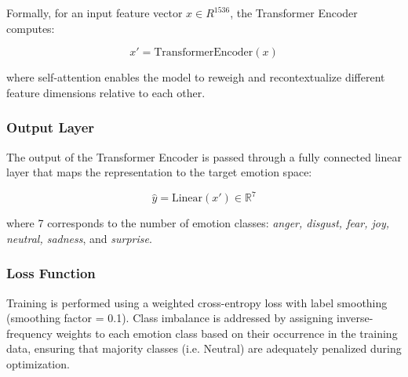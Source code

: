 \documentclass{article}
\begin{document}
Formally, for an input feature vector $ x \in {R}^{1536} $, the Transformer Encoder computes:

$$ x' = \text{TransformerEncoder}(x) $$

where self-attention enables the model to reweigh and recontextualize different feature dimensions relative to each other.

\subsubsection{Output Layer}
The output of the Transformer Encoder is passed through a fully connected linear layer that maps the representation to the target emotion space:

$$\hat{y} = \text{Linear}(x') \in \mathbb{R}^{7}$$

where 7 corresponds to the number of emotion classes: \textit{anger, disgust, fear, joy, neutral, sadness}, and \textit{surprise}.

\subsubsection{Loss Function}
Training is performed using a weighted cross-entropy loss with label smoothing (smoothing factor = 0.1). Class imbalance is addressed by assigning inverse-frequency weights to each emotion class based on their occurrence in the training data, ensuring that majority classes (i.e. Neutral) are adequately penalized during optimization.
\end{document}
